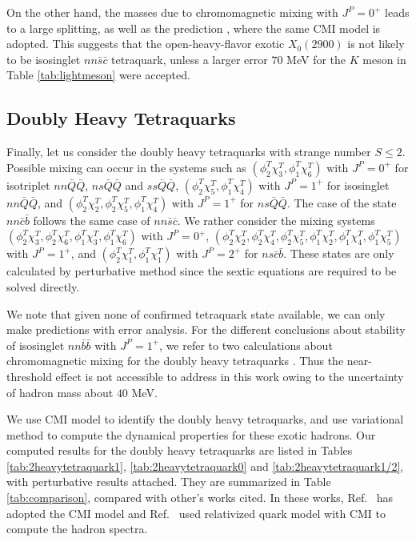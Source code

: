 \documentclass[prd,twocolumn,floatfix,nofootinbib]{revtex4}
\begin{document}
On the other hand, the masses due to chromomagnetic mixing with $J^{P}=0^{+}$ leads to a large splitting, as well as the prediction \cite{Luo:2017eub}, where the same CMI model is adopted. 
This suggests that the open-heavy-flavor exotic $X_{0}(2900)$ is not likely to be isosinglet $nn\bar{s}\bar{c}$ tetraquark, unless a larger error $70$ MeV for the $K$ meson in Table \ref{tab:lightmeson} were accepted.


\subsection{Doubly Heavy Tetraquarks}
Finally, let us consider the doubly heavy tetraquarks with strange number $S\leq 2$. Possible mixing can occur in the systems such as 
$(\phi_{2}^{T}\chi_{3}^{T},\phi_{1}^{T}\chi_{6}^{T})$ with $J^{P}=0^{+}$ for isotriplet $nn\bar{Q}\bar{Q}$, $ns\bar{Q}\bar{Q}$ and $ss\bar{Q}\bar{Q}$,
$(\phi_{2}^{T}\chi_{5}^{T},\phi_{1}^{T}\chi_{4}^{T})$ with $J^{P}=1^{+}$ for isosinglet $nn\bar{Q}\bar{Q}$, and 
$(\phi_{2}^{T}\chi_{2}^{T},\phi_{2}^{T}\chi_{5}^{T},\phi_{1}^{T}\chi_{4}^{T})$ with $J^{P}=1^{+}$ for $ns\bar{Q}\bar{Q}$. 
The case of the state $nn\bar{c}\bar{b}$ follows the same case of $nn\bar{s}\bar{c}$. 
We rather consider the mixing systems 
$(\phi_{2}^{T}\chi_{3}^{T},\phi_{2}^{T}\chi_{6}^{T},\phi_{1}^{T}\chi_{3}^{T},\phi_{1}^{T}\chi_{6}^{T})$ with $J^{P}=0^{+}$, 
$(\phi_{2}^{T}\chi_{2}^{T},\phi_{2}^{T}\chi_{4}^{T},\phi_{2}^{T}\chi_{5}^{T},\phi_{1}^{T}\chi_{2}^{T},\phi_{1}^{T}\chi_{4}^{T},\phi_{1}^{T}\chi_{5}^{T})$ with $J^{P}=1^{+}$, and
$(\phi_{2}^{T}\chi_{1}^{T},\phi_{1}^{T}\chi_{1}^{T})$ with $J^{P}=2^{+}$ for $ns\bar{c}\bar{b}$.
These states are only calculated by perturbative method since the sextic equations are required to be solved directly.

We note that given none of confirmed tetraquark state available, we can only make predictions with error analysis.
For the different conclusions about stability of isosinglet $nn\bar{b}\bar{b}$ with $J^{P}=1^{+}$, we refer to two calculations about chromomagnetic mixing for the doubly heavy tetraquarks \cite{Luo:2017eub,Lu:2020rog}. 
Thus the near-threshold effect is not accessible to address in this work owing to the uncertainty of hadron mass about $40$ MeV. 

We use CMI model to identify the doubly heavy tetraquarks, and use variational method to compute the dynamical properties for these exotic hadrons. 
Our computed results for the doubly heavy tetraquarks are listed in Tables \ref{tab:2heavytetraquark1}, \ref{tab:2heavytetraquark0} and \ref{tab:2heavytetraquark1/2}, with perturbative results attached. 
They are summarized in Table \ref{tab:comparison}, compared with other's works cited. In these works, Ref.~\cite{Luo:2017eub} has adopted the CMI model and Ref.~\cite{Lu:2020rog} used relativized quark model with CMI to compute the hadron spectra. 
\end{document}

